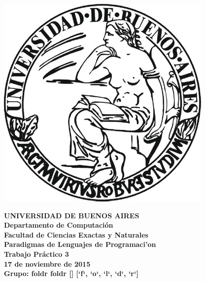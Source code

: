 \documentclass[11pt,a4paper]{article}
\begin{document}

\def\Materia{Paradigmas de Lenguajes de Programaci'on}
\def\Titulo{Trabajo Pr\'{a}ctico 3}
\def\Fecha{17 de noviembre de 2015}


\thispagestyle{empty}

\begin{center}
	\includegraphics[scale = 0.25]{imagenes/logo_uba.jpg}
\end{center}

\begin{center}
	{\textbf{\large UNIVERSIDAD DE BUENOS AIRES}}\\[1.5em]
	{\textbf{\large Departamento de Computaci\'{o}n}}\\[1.5em]
    {\textbf{\large Facultad de Ciencias Exactas y Naturales}}\\
    \vspace{35mm}
    {\LARGE\textbf{\Materia}}\\[1em]    
    \vspace{15mm}
    {\Large \textbf{\Titulo}}\\[1em]
    \vspace{15mm}
    {\textbf{\Large \Fecha}}\\
    \vspace{15mm}
	{\textbf{\Large Grupo: foldr foldr []
[`f`, `o`, `l`, `d`, `r`]}}\\
    \vspace{15mm}
    \textbf{\tablaints}
\end{center}
\end{document}
